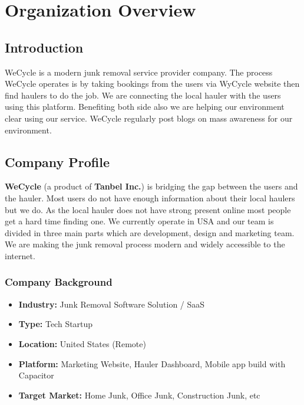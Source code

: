 \chapter{Organization Overview}
\label{chapter-2}

\section{Introduction}

\par WeCycle \cite{wecycle2024} is a modern junk removal service provider company. The process WeCycle operates is by taking bookings from the users via WyCycle website then find haulers to do the job. We are connecting the local hauler with the users using this platform. Benefiting both side also we are helping our environment clear using our service. WeCycle regularly post blogs on mass awareness for our environment.

\section{Company Profile}

\par \textbf{WeCycle} (a product of \textbf{Tanbel Inc.}) is bridging the gap between the users and the hauler. Most users do not have enough information about their local haulers but we do. As the local hauler does not have strong present online most people get a hard time finding one. We currently operate in USA and our team is divided in three main parts which are development, design and marketing team. We are making the junk removal process modern and widely accessible to the internet.

\subsection{Company Background}
\begin{itemize}
    \item \textbf{Industry:} Junk Removal Software Solution / SaaS
    \item \textbf{Type:} Tech Startup
    \item \textbf{Location:} United States (Remote)
    \item \textbf{Platform:} Marketing Website, Hauler Dashboard, Mobile app build with Capacitor
    \item \textbf{Target Market:} Home Junk, Office Junk, Construction Junk, etc
\end{itemize}

